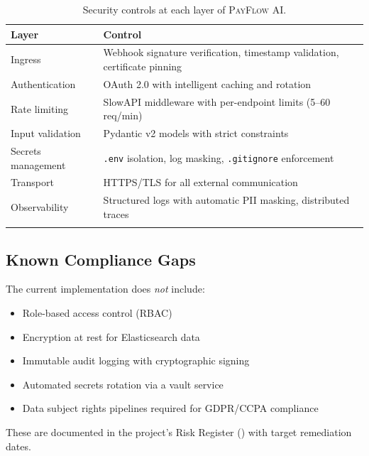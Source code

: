 \documentclass[11pt,a4paper]{article}
\newcommand{\payflow}{\textsc{PayFlow AI}}
\begin{document}
\begin{table}[ht]
  \centering
  \begin{tabular}{lp{9cm}}
  \toprule
  \textbf{Layer} & \textbf{Control} \\
  \midrule
  Ingress & Webhook signature verification, timestamp validation, certificate pinning \\
  Authentication & OAuth 2.0 with intelligent caching and rotation \\
  Rate limiting & SlowAPI middleware with per-endpoint limits (5--60 req/min) \\
  Input validation & Pydantic v2 models with strict constraints \\
  Secrets management & \texttt{.env} isolation, log masking, \texttt{.gitignore} enforcement \\
  Transport & HTTPS/TLS for all external communication \\
  Observability & Structured logs with automatic PII masking, distributed traces \\
  \bottomrule
  \caption{Security controls at each layer of \payflow.}
  \label{tab:security-controls}
  \end{tabular}
\end{table}

\subsection{Known Compliance Gaps}
\label{subsec:compliance-gaps}

The current implementation does \emph{not} include:
\begin{itemize}[leftmargin=*]
  \item Role-based access control (RBAC)
  \item Encryption at rest for Elasticsearch data
  \item Immutable audit logging with cryptographic signing
  \item Automated secrets rotation via a vault service
  \item Data subject rights pipelines required for GDPR/CCPA compliance
\end{itemize}

These are documented in the project's Risk Register () with target remediation dates.

\end{document}
